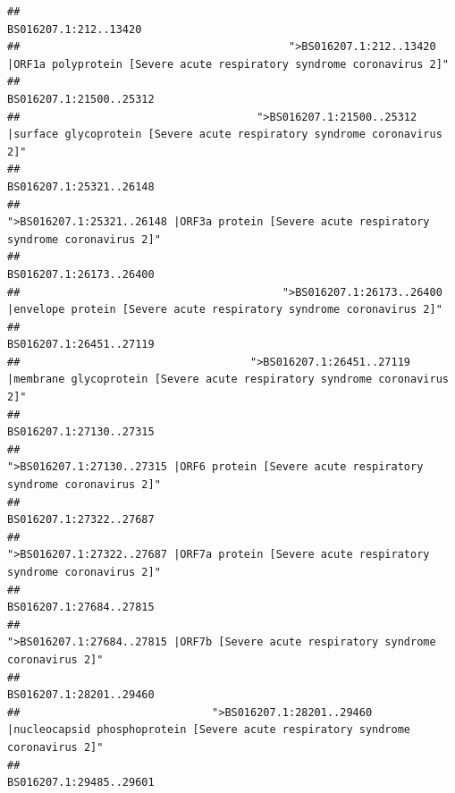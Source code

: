 \documentclass[
]{article}
\begin{document}
\begin{verbatim}
##                                                                                                                  BS016207.1:212..13420 
##                                          ">BS016207.1:212..13420 |ORF1a polyprotein [Severe acute respiratory syndrome coronavirus 2]" 
##                                                                                                                BS016207.1:21500..25312 
##                                     ">BS016207.1:21500..25312 |surface glycoprotein [Severe acute respiratory syndrome coronavirus 2]" 
##                                                                                                                BS016207.1:25321..26148 
##                                            ">BS016207.1:25321..26148 |ORF3a protein [Severe acute respiratory syndrome coronavirus 2]" 
##                                                                                                                BS016207.1:26173..26400 
##                                         ">BS016207.1:26173..26400 |envelope protein [Severe acute respiratory syndrome coronavirus 2]" 
##                                                                                                                BS016207.1:26451..27119 
##                                    ">BS016207.1:26451..27119 |membrane glycoprotein [Severe acute respiratory syndrome coronavirus 2]" 
##                                                                                                                BS016207.1:27130..27315 
##                                             ">BS016207.1:27130..27315 |ORF6 protein [Severe acute respiratory syndrome coronavirus 2]" 
##                                                                                                                BS016207.1:27322..27687 
##                                            ">BS016207.1:27322..27687 |ORF7a protein [Severe acute respiratory syndrome coronavirus 2]" 
##                                                                                                                BS016207.1:27684..27815 
##                                                    ">BS016207.1:27684..27815 |ORF7b [Severe acute respiratory syndrome coronavirus 2]" 
##                                                                                                                BS016207.1:28201..29460 
##                              ">BS016207.1:28201..29460 |nucleocapsid phosphoprotein [Severe acute respiratory syndrome coronavirus 2]" 
##                                                                                                                BS016207.1:29485..29601 

\end{verbatim}
\end{document}
